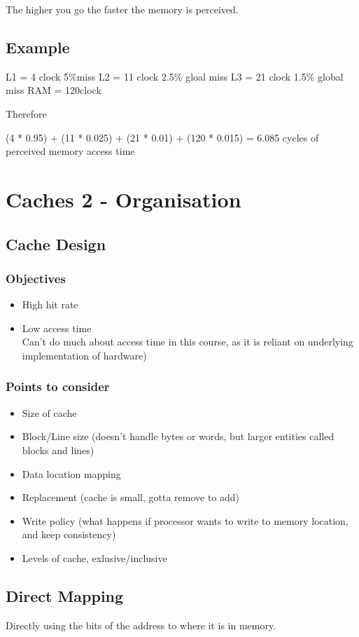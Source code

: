 \documentclass{article}
\begin{document}
		The higher you go the faster the memory is perceived.

	\subsection*{Example}
		L1 = 4 clock	5\%miss
		L2 = 11 clock	2.5\% gloal miss
		L3 = 21 clock	1.5\% global miss
		RAM = 120clock

		Therefore

		(4 * 0.95) + (11 * 0.025) + (21 * 0.01) + (120 * 0.015) = 6.085 cycles of perceived memory access time

\section{Caches 2 - Organisation}
	\subsection*{Cache Design}
		\subsubsection*{Objectives}
		\begin{itemize}
			\item High hit rate
			\item Low access time\\
			Can't do much about access time in this course, as it is reliant on underlying implementation of hardware)
		\end{itemize}

		\subsubsection*{Points to consider}
		\begin{itemize}
			\item Size of cache
			\item Block/Line size (doesn't handle bytes or words, but larger entities called blocks and lines)
			\item Data location mapping
			\item Replacement (cache is small, gotta remove to add)
			\item Write policy (what happens if processor wants to write to memory location, and keep consistency)
			\item Levels of cache, exlusive/inclusive
		\end{itemize}

	\subsection*{Direct Mapping}
		Directly using the bits of the address to where it is in memory.
\end{document}
